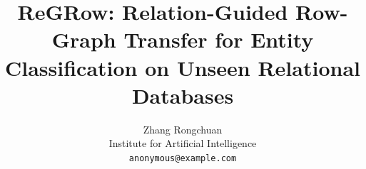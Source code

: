 \documentclass{article}
\title{ReGRow: Relation-Guided Row-Graph Transfer for Entity Classification on Unseen Relational Databases}
\author{%
  Zhang Rongchuan \\
  Institute for Artificial Intelligence \\
  \texttt{anonymous@example.com}
}
\newcommand{\model}{\textsc{ReGRow}}
\begin{document}
\maketitle

\begin{abstract}




\end{abstract}
\end{document}

